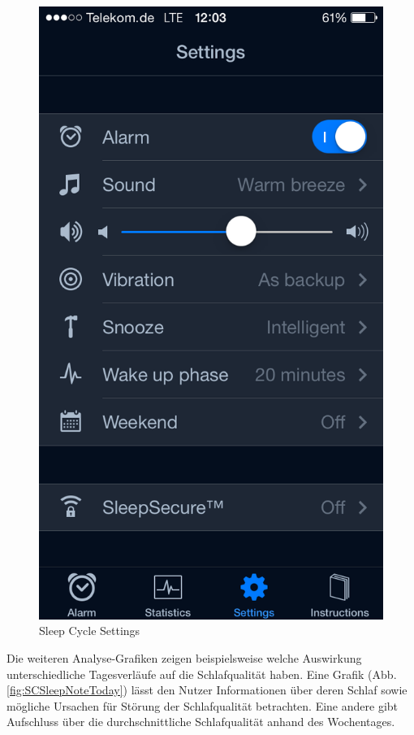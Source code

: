 \begin{figure}[H]
\begin{minipage}[b]{0.47\textwidth}
    \includegraphics[scale=0.3]{images/SleepCycle/Settings1}  
    \caption{Sleep Cycle Settings}
    \label{fig:SCSettings}
  \end{minipage}
\end{figure}

Die weiteren Analyse-Grafiken zeigen beispielsweise welche Auswirkung unterschiedliche Tagesverläufe auf die Schlafqualität haben. 
Eine Grafik (Abb. \ref{fig:SCSleepNoteToday}) lässt den Nutzer Informationen über deren Schlaf sowie mögliche Ursachen für Störung der Schlafqualität betrachten.
Eine andere gibt Aufschluss über die durchschnittliche Schlafqualität anhand des Wochentages.

